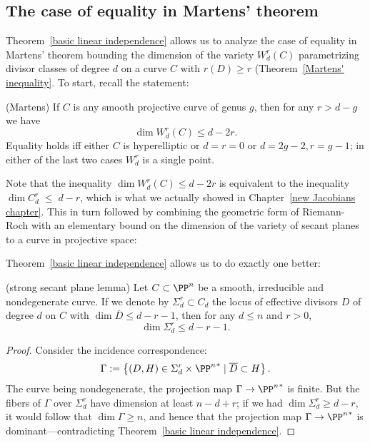 \subsection{The case of equality in Martens' theorem}

Theorem~\ref{basic linear independence}  allows us to analyze the case of equality in Martens' theorem bounding the dimension of the variety $W^r_d(C)$ parametrizing divisor classes of degree $d$ on a curve $C$ with $r(D) \geq r$
(Theorem~\ref{Martens' inequality}.
To start, recall the statement:

\begin{theorem}(Martens)\label{full Martens}
If $C$ is any smooth projective curve of genus $g$, then for any $r>d-g$ we have
$$
\dim W^r_d(C) \leq d-2r.
$$
Equality holds iff either $C$ is hyperelliptic
or $d=r=0$ or $d=2g-2, r=g-1$; in either of the last two cases $W^r_d$ is
a single point.
\end{theorem}

Note that the inequality $\dim W^r_d(C) \leq d-2r$ is equivalent to the inequality $\dim C^r_d \; \leq \; d-r$, which is what we actually showed in Chapter~\ref{new Jacobians chapter}. This in turn followed by combining the geometric form of Riemann-Roch with an elementary bound on the dimension of the variety of secant planes to a curve in projective space:

Theorem~\ref{basic linear independence} allows us to do exactly one better: 

\begin{lemma}(strong secant plane lemma)\label{Strong secant plane lemma}
Let $C \subset \PP^n$ be a smooth, irreducible and nondegenerate curve. If we denote by $\Sigma^r_d \subset C_d$ the locus of effective divisors $D$ of degree $d$ on $C$ with $\dim \overline D \leq d-r-1$, then for any $d \leq n$ and $r > 0$,
$$
\dim \Sigma^r_d \leq d-r-1.
$$
\end{lemma}

\begin{proof}
Consider the incidence correspondence: 
$$
\Gamma := \left\{ (D, H) \in \Sigma^r_d\times {\PP^n}^* \mid \overline D \subset H \right\}.
$$
The curve being nondegenerate, the projection map $\Gamma \to  {\PP^n}^*$ is finite. But the fibers of $\Gamma$ over $\Sigma^r_d$ have dimension at least $n-d+r$; if we had $\dim \Sigma^r_d \geq d-r$, it would follow that $\dim \Gamma \geq n$, and hence that the projection map $\Gamma \to  {\PP^n}^*$ is dominant---contradicting Theorem~\ref{basic linear independence}.
\end{proof}

